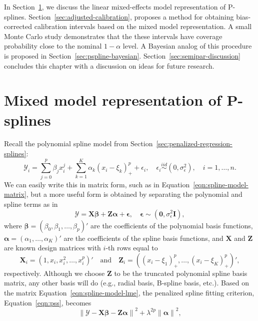 \documentclass[cmfont,usenames,dvipsnames,leqno]{afit-etd}\usepackage[]{graphicx}\usepackage[]{color}
\newcommand{\norm}[1]{\left\|#1\right\|}
\newcommand{\bc}[1]{\ensuremath{\bm{\mathcal{#1}}}}
\newcommand{\mc}[1]{\ensuremath{\mathcal{#1}}}
\begin{document}
In Section~\ref{sec:pspline-lmm}, we discuss the linear mixed-effects model representation of P-splines. Section~\ref{sec:adjusted-calibration}, proposes a method for obtaining bias-corrected calibration intervals based on the mixed model representation. A small Monte Carlo study demonstrates that the these intervals have coverage probability close to the nominal $1-\alpha$ level. A Bayesian analog of this procedure is proposed in Section~\ref{sec:pspline-bayesian}. Section~\ref{sec:semipar-discussion} concludes this chapter with a discussion on ideas for future research.

\section{Mixed model representation of P-splines}
\label{sec:pspline-lmm}
Recall the polynomial spline model from Section~\ref{sec:penalized-regression-splines}:
\begin{equation}
  \mc{Y}_i = \sum_{j = 0}^p\beta_jx_i^j + \sum_{k = 1}^K \alpha_k\left(x_i - \xi_k\right)_+^p + \epsilon_i, \quad \epsilon_i \stackrel{iid}{\sim} \left(0, \sigma_\epsilon^2\right), \quad i = 1, \dotsc, n.
\end{equation}
We can easily write this in matrix form, such as in Equation~\eqref{eqn:spline-model-matrix}, but a more useful form is obtained by separating the polynomial and spline terms as in
\begin{equation}
\label{eqn:spline-model-lme}
  \bc{Y} = \bm{X}\bm{\beta} + \bm{Z}\bm{\alpha} + \bm{\epsilon}, \quad \bm{\epsilon} \sim \left(\bm{0}, \sigma_\epsilon^2\bm{I}\right),
\end{equation}
where $\bm{\beta} = (\beta_0, \beta_1, \dotsc, \beta_p)'$ are the coefficients of the polynomial basis functions, $\bm{\alpha} = (\alpha_1, \dotsc, \alpha_K)'$ are the coefficients of the spline basis functions, and $\bm{X}$ and $\bm{Z}$ are known design matrices with $i$-th rows equal to
\begin{equation*}
\bm{X}_i = \left(1, x_i, x_i^2, \dotsc, x_i^p \right)' \quad \text{and} \quad  \bm{Z}_i = \left( (x_i - \xi_1)_+^p, \dotsc, (x_i - \xi_K)_+^p \right)',
\end{equation*}
respectively. Although we choose $\bm{Z}$ to be the truncated polynomial spline basis matrix, any other basis will do (e.g., radial basis, B-spline basis, etc.). Based on the matrix Equation~\eqref{eqn:spline-model-lme}, the penalized spline fitting criterion, Equation~\eqref{eqn:pss}, becomes
\begin{equation*}
  \norm{\bc{Y} - \bm{X}\bm{\beta} - \bm{Z}\bm{\alpha}}^2 + \lambda^{2p}\norm{\bm{\alpha}}^2,
\end{equation*}
\end{document}
